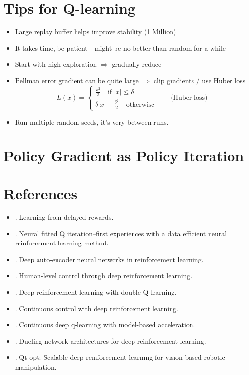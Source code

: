 \section{Tips for Q-learning}
\begin{itemize}
	\item Large replay buffer helps improve stability (1 Million)
	\item It takes time, be patient - might be no better than random for a while
	\item Start with high exploration $\Rightarrow$ gradually reduce
	\item Bellman error gradient can be quite large $\Rightarrow$ clip gradients / use Huber loss
	\begin{equation}
		L(x) = \begin{cases}
			\frac{x^2}{2} \quad \text{if } |x| \leq \delta\\
			\delta|x| - \frac{\delta^2}{2} \quad \text{otherwise}
		\end{cases} \qquad \text{(Huber loss)}
	\end{equation}
	\item Run multiple random seeds, it's very  between runs.	
\end{itemize}

\section{Policy Gradient as Policy Iteration}

\section{References}
\begin{itemize}
	\item {}. Learning from delayed rewards.
	\item {}. Neural fitted Q iteration--first experiences with a data efficient neural reinforcement learning method.
	\item {}. Deep auto-encoder neural networks in reinforcement learning.
	\item {}. Human-level control through deep reinforcement learning.
	\item {}. Deep reinforcement learning with double Q-learning.
	\item {}. Continuous control with deep reinforcement learning.
	\item {}. Continuous deep q-learning with model-based acceleration.
	\item {}. Dueling network architectures for deep reinforcement learning.
	\item {}. Qt-opt: Scalable deep reinforcement learning for vision-based robotic manipulation.
\end{itemize}